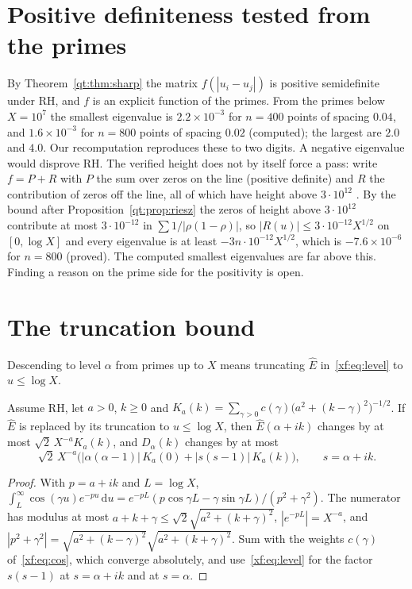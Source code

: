 \section{Positive definiteness tested from the primes}

By Theorem~\ref{qt:thm:sharp} the matrix $f(|u_i-u_j|)$ is positive semidefinite under RH, and $f$ is an explicit function of the primes. From the primes below $X=10^7$ the smallest eigenvalue is $2.2\times10^{-3}$ for $n=400$ points of spacing $0.04$, and $1.6\times10^{-3}$ for $n=800$ points of spacing $0.02$ (computed); the largest are $2.0$ and $4.0$. Our recomputation reproduces these to two digits. A negative eigenvalue would disprove RH. The verified height does not by itself force a pass: write $f=P+R$ with $P$ the sum over zeros on the line (positive definite) and $R$ the contribution of zeros off the line, all of which have height above $3\cdot10^{12}$ \cite{PT21}. By the bound after Proposition~\ref{qt:prop:riesz} the zeros of height above $3\cdot10^{12}$ contribute at most $3\cdot10^{-12}$ in $\sum1/|\rho(1-\rho)|$, so $|R(u)|\le3\cdot10^{-12}X^{1/2}$ on $[0,\log X]$ and every eigenvalue is at least $-3n\cdot10^{-12}X^{1/2}$, which is $-7.6\times10^{-6}$ for $n=800$ (proved). The computed smallest eigenvalues are far above this. Finding a reason on the prime side for the positivity is open.

\section{The truncation bound}\label{xf:sec:trunc}

Descending to level $\alpha$ from primes up to $X$ means truncating $\widehat E$ in~\eqref{xf:eq:level} to $u\le\log X$.

\begin{theorem}\label{xf:thm:trunc}
Assume RH, let $a>0$, $k\ge0$ and $K_a(k)=\sum_{\gamma>0}c(\gamma)\bigl(a^2+(k-\gamma)^2\bigr)^{-1/2}$. If $\widehat E$ is replaced by its truncation to $u\le\log X$, then $\widehat E(\alpha+ik)$ changes by at most $\sqrt2\,X^{-a}K_a(k)$, and $D_\alpha(k)$ changes by at most
\[
\sqrt2\,X^{-a}\bigl(|\alpha(\alpha-1)|\,K_a(0)+|s(s-1)|\,K_a(k)\bigr),\qquad s=\alpha+ik .
\]
\end{theorem}

\begin{proof}
With $p=a+ik$ and $L=\log X$, $\int_L^\infty\cos(\gamma u)e^{-pu}\,\mathrm du=e^{-pL}(p\cos\gamma L-\gamma\sin\gamma L)/(p^2+\gamma^2)$. The numerator has modulus at most $a+k+\gamma\le\sqrt2\sqrt{a^2+(k+\gamma)^2}$, $|e^{-pL}|=X^{-a}$, and $|p^2+\gamma^2|=\sqrt{a^2+(k-\gamma)^2}\sqrt{a^2+(k+\gamma)^2}$. Sum with the weights $c(\gamma)$ of~\eqref{xf:eq:cos}, which converge absolutely, and use~\eqref{xf:eq:level} for the factor $s(s-1)$ at $s=\alpha+ik$ and at $s=\alpha$.
\end{proof}


